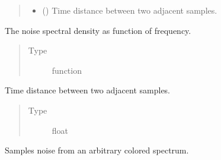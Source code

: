 \documentclass[letterpaper,10pt,english]{sphinxmanual}
\begin{document}
\begin{fulllineitems}
\begin{quote}
\begin{description}
\begin{itemize}
\item {} 
 () \textendash{} Time distance between two adjacent samples.

\end{itemize}

\end{description}\end{quote}

\begin{fulllineitems}
\label{\detokenize{qsim:qsim.noise.NTGColoredNoise.noise_spectral_density}}
The noise spectral density as function of frequency.
\begin{quote}\begin{description}
\item[{Type}] \leavevmode
function

\end{description}\end{quote}

\end{fulllineitems}


\begin{fulllineitems}
\label{\detokenize{qsim:qsim.noise.NTGColoredNoise.dt}}
Time distance between two adjacent samples.
\begin{quote}\begin{description}
\item[{Type}] \leavevmode
float

\end{description}\end{quote}

\end{fulllineitems}



\begin{fulllineitems}
Samples noise from an arbitrary colored spectrum.

\end{fulllineitems}




\end{fulllineitems}
\end{document}
